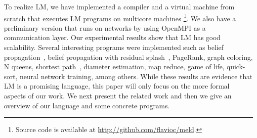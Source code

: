 To realize LM, we have implemented a compiler and a virtual machine from scratch that executes LM programs on multicore machines
\footnote{Source code is available at \url{http://github.com/flavioc/meld}.}. We also have a preliminary version that runs on networks by
using OpenMPI as a communication layer. Our experimental results show that LM has good scalability.
Several interesting programs were implemented such as belief propagation~\cite{Gonzalez+al:aistats09paraml},
belief propagation with residual splash~\cite{Gonzalez+al:aistats09paraml}, PageRank, graph coloring,
N queens, shortest path~\cite{Dijkstra}, diameter estimation, map reduce, game of life, quick-sort, neural network training, among others.
While these results are evidence that LM is a promising language, this paper will only focus on the more formal aspects of our work.
We next present the related work and then we give an overview of our language and some concrete programs.
